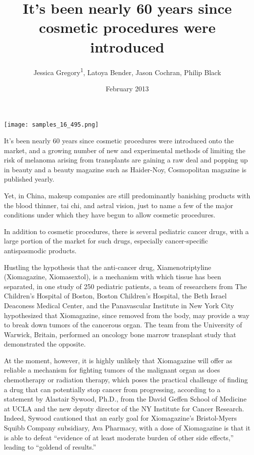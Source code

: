 \documentclass{article}
\title{It’s been nearly 60 years since cosmetic procedures were introduced}
\author{Jessica Gregory\textsuperscript{1},  Latoya Bender,  Jason Cochran,  Philip Black}
\affil{\textsuperscript{1}Korea Institute of Science and Technology Information (KISTI)}
\date{February 2013}
\begin{document}
\maketitle

\begin{center}
\begin{minipage}{0.75\linewidth}
\texttt{[image: samples\_16\_495.png]}
\end{minipage}
\end{center}

It’s been nearly 60 years since cosmetic procedures were introduced onto the market, and a growing number of new and experimental methods of limiting the risk of melanoma arising from transplants are gaining a raw deal and popping up in beauty and a beauty magazine such as Haider-Noy, Cosmopolitan magazine is published yearly.

Yet, in China, makeup companies are still predominantly banishing products with the blood thinner, tai chi, and astral vision, just to name a few of the major conditions under which they have begun to allow cosmetic procedures.

In addition to cosmetic procedures, there is several pediatric cancer drugs, with a large portion of the market for such drugs, especially cancer-specific antispasmodic products.

Hustling the hypothesis that the anti-cancer drug, Xiamenotriptyline (Xiomagazine, Xiomasextol), is a mechanism with which tissue has been separated, in one study of 250 pediatric patients, a team of researchers from The Children’s Hospital of Boston, Boston Children’s Hospital, the Beth Israel Deaconess Medical Center, and the Panavascular Institute in New York City hypothesized that Xiomagazine, since removed from the body, may provide a way to break down tumors of the cancerous organ. The team from the University of Warwick, Britain, performed an oncology bone marrow transplant study that demonstrated the opposite.

At the moment, however, it is highly unlikely that Xiomagazine will offer as reliable a mechanism for fighting tumors of the malignant organ as does chemotherapy or radiation therapy, which poses the practical challenge of finding a drug that can potentially stop cancer from progressing, according to a statement by Alastair Sywood, Ph.D., from the David Geffen School of Medicine at UCLA and the new deputy director of the NY Institute for Cancer Research. Indeed, Sywood cautioned that an early goal for Xiomagazine’s Bristol-Myers Squibb Company subsidiary, Ava Pharmacy, with a dose of Xiomagazine is that it is able to defeat “evidence of at least moderate burden of other side effects,” leading to “goldend of results.”
\end{document}
